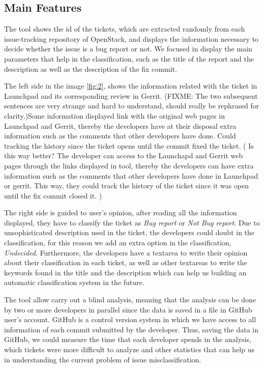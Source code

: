 \documentclass[ifip]{svmult}
\begin{document}
\subsection{Main Features}
\label{sec:2.2}
The tool shows the id of the tickets, which are extracted randomly from each issue-tracking repository of OpenStack, and displays the information necessary to decide whether the issue is a bug report or not. We focused in display the main parameters that help in the classification, such as the title of the report and the description as well as the description of the fix commit.

The left side in the image \ref{fig:2}, shows the information related with the ticket in Launchpad and its corresponding review in Gerrit. (FIXME: The two subsequent sentences are very strange and hard to understand, should really be rephrased for clarity.)Some information displayed link with the original web pages in Launchpad and Gerrit, thereby the developers have at their disposal extra information such as the comments that other developers have done. Could tracking the history since the ticket opens until the commit fixed the ticket. ( Is this way better? The developer can access to the Launchapd and Gerrit web pages through the links displayed in tool, thereby the developers can have extra information such as the comments that other developers have done in Launchpad or gerrit. This way, they could track the history of the ticket since it was open until the fix commit closed it. )

The right side is guided to user's opinion, after reading all the information displayed, they have to classify the ticket as \textit{Bug report} or \textit{Not Bug report}. Due to unsophisticated description used in the ticket, the developers could doubt in the classification, for this reason we add an extra option in the classification, \textit{Undecided}. Furthermore, the developers have a textarea to write their opinion about their classification in each ticket, as well as other textareas to write the keywords found in the title and the description which can help us building an automatic classification system in the future.

The tool allow carry out a blind analysis, meaning that the analysis can be done by two or more developers in parallel since the data is saved in a file in GitHub user's account. GitHub is a control version system in which we have access to all information of each commit submitted by the developer. Thus, saving the data in GitHub, we could measure the time that each developer spends in the analysis, which tickets were more difficult to analyze and other statistics that can help us in understanding the current problem of issue misclassification.
\end{document}
